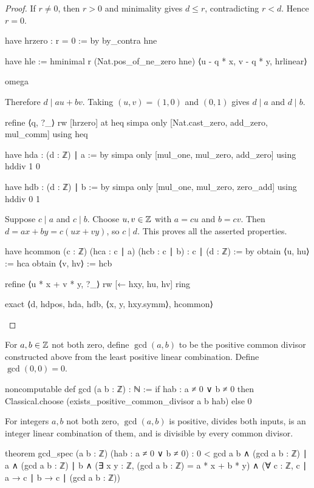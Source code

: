 \begin{proof}
  If $r\ne0$, then $r>0$ and minimality gives $d\le r$, contradicting $r<d$.
  Hence $r=0$.

  \begin{lean}
    have hrzero : r = 0 := by
      by_contra hne

      have hle := hminimal r (Nat.pos_of_ne_zero hne)
        ⟨u - q * x, v - q * y, hrlinear⟩

      omega
  \end{lean}

  Therefore $d\mid au+bv$.
  Taking $(u,v)=(1,0)$ and $(0,1)$ gives $d\mid a$ and $d\mid b$.

  \begin{lean}
      refine ⟨q, ?_⟩
      rw [hrzero] at heq
      simpa only [Nat.cast_zero, add_zero, mul_comm] using heq

    have hda : (d : ℤ) ∣ a := by
      simpa only [mul_one, mul_zero, add_zero] using hddiv 1 0

    have hdb : (d : ℤ) ∣ b := by
      simpa only [mul_one, mul_zero, zero_add] using hddiv 0 1
  \end{lean}

  Suppose $c\mid a$ and $c\mid b$.
  Choose $u,v\in\mathbb{Z}$ with $a=cu$ and $b=cv$.
  Then $d=ax+by=c(ux+vy)$, so $c\mid d$.
  This proves all the asserted properties.

  \begin{lean}
    have hcommon (c : ℤ) (hca : c ∣ a) (hcb : c ∣ b) : c ∣ (d : ℤ) := by
      obtain ⟨u, hu⟩ := hca
      obtain ⟨v, hv⟩ := hcb

      refine ⟨u * x + v * y, ?_⟩
      rw [← hxy, hu, hv]
      ring

    exact ⟨d, hdpos, hda, hdb, ⟨x, y, hxy.symm⟩, hcommon⟩
  \end{lean}
\end{proof}

\begin{definition}
  For $a,b\in\mathbb{Z}$ not both zero, define $\gcd(a,b)$ to be the positive common divisor constructed
  above from the least positive linear combination.
  Define $\gcd(0,0)=0$.

  \begin{lean}
    noncomputable def gcd (a b : ℤ) : ℕ :=
      if hab : a ≠ 0 ∨ b ≠ 0 then
        Classical.choose (exists_positive_common_divisor a b hab)
      else 0
  \end{lean}
\end{definition}

\begin{theorem}
  \label{ent:thm:gcd-spec}
  For integers $a,b$ not both zero, $\gcd(a,b)$ is positive, divides both inputs, is an integer
  linear combination of them, and is divisible by every common divisor.

  \begin{lean}
    theorem gcd_spec (a b : ℤ) (hab : a ≠ 0 ∨ b ≠ 0) :
        0 < gcd a b ∧ (gcd a b : ℤ) ∣ a ∧ (gcd a b : ℤ) ∣ b ∧
          (∃ x y : ℤ, (gcd a b : ℤ) = a * x + b * y) ∧
          (∀ c : ℤ, c ∣ a → c ∣ b → c ∣ (gcd a b : ℤ))
  \end{lean}
\end{theorem}

